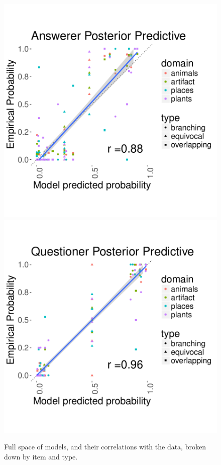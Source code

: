 \documentclass[12pt, floatsintext, jou]{apa6}
\begin{document}
\begin{figure}[t!]
\begin{center}
\includegraphics[scale=.5]{betaZeroAnswerer_Predictives}
\includegraphics[scale=.5]{betaZeroQuestioner_Predictives}
\end{center}
\caption{Full space of models, and their correlations with the data, broken down by item and type.}
\label{fig:Exp2ModelSpace}
\end{figure}
\end{document}
